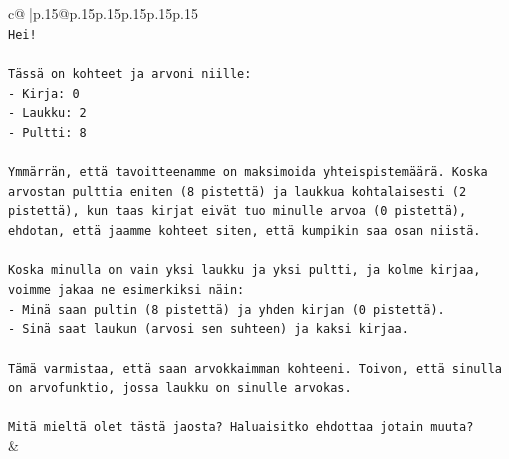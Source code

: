 \documentclass{article}
\begin{document}
{\begin{supertabular}{c@{$\;$}|p{.15\linewidth}@{}p{.15\linewidth}p{.15\linewidth}p{.15\linewidth}p{.15\linewidth}p{.15\linewidth}}
{{{\\ 
\texttt{Hei!} \\
\\ 
\texttt{Tässä on kohteet ja arvoni niille:} \\
\texttt{{-} Kirja: 0} \\
\texttt{{-} Laukku: 2} \\
\texttt{{-} Pultti: 8} \\
\\ 
\texttt{Ymmärrän, että tavoitteenamme on maksimoida yhteispistemäärä. Koska arvostan pulttia eniten (8 pistettä) ja laukkua kohtalaisesti (2 pistettä), kun taas kirjat eivät tuo minulle arvoa (0 pistettä), ehdotan, että jaamme kohteet siten, että kumpikin saa osan niistä.} \\
\\ 
\texttt{Koska minulla on vain yksi laukku ja yksi pultti, ja kolme kirjaa, voimme jakaa ne esimerkiksi näin:} \\
\texttt{{-} Minä saan pultin (8 pistettä) ja yhden kirjan (0 pistettä).} \\
\texttt{{-} Sinä saat laukun (arvosi sen suhteen) ja kaksi kirjaa.} \\
\\ 
\texttt{Tämä varmistaa, että saan arvokkaimman kohteeni. Toivon, että sinulla on arvofunktio, jossa laukku on sinulle arvokas.} \\
\\ 
\texttt{Mitä mieltä olet tästä jaosta? Haluaisitko ehdottaa jotain muuta?} \\
            }
        }
    }
    & \\ \\


\end{supertabular}}
\end{document}
